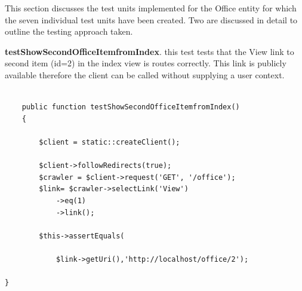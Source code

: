 \documentclass[a4paper,Times New Roman 11pt]{article}
\begin{document}
This section discusses the test units implemented for the Office entity for which the seven individual test units have been created. Two are discussed in detail to outline the testing approach taken.


\textbf{testShowSecondOfficeItemfromIndex}. this test tests that the View link to second item (id=2) in the index view is routes correctly. This link is publicly available therefore the client can be called without supplying a user context.
\begin{verbatim}

    public function testShowSecondOfficeItemfromIndex()
    {

        $client = static::createClient();

        $client->followRedirects(true);
        $crawler = $client->request('GET', '/office');
        $link= $crawler->selectLink('View')
            ->eq(1)
            ->link();

        $this->assertEquals(

            $link->getUri(),'http://localhost/office/2');

}
\end{verbatim}
\end{document}
